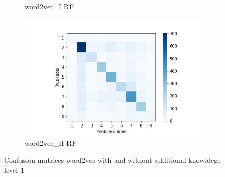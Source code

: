 \documentclass[12pt, a4paper, titlepage]{article}
\begin{document}
\begin{figure}
\begin{subfigure}[b]{0.475\textwidth}
    {{\small word2vec\_I RF}}    
  \end{subfigure}
  \hfill
  \begin{subfigure}[b]{0.475\textwidth}   
      \centering 
      \includegraphics[width=\textwidth]{cm_word2vec_with_RF.jpg}
      {{\small word2vec\_II RF}}    
  \end{subfigure}
  \caption{\label{fig: F23} Confusion matrices word2vec with and without additional knowldege level 1}
\end{figure}
\end{document}
